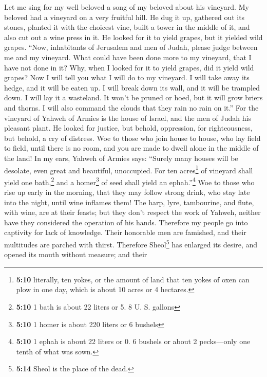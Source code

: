  Let me sing for my well beloved a song of my beloved
about his vineyard. My beloved had a vineyard on a very fruitful hill.
 He dug it up, gathered out its stones, planted it with
the choicest vine, built a tower in the middle of it, and also cut out a
wine press in it. He looked for it to yield grapes, but it yielded wild
grapes.  ``Now, inhabitants of Jerusalem and men of Judah,
please judge between me and my vineyard.  What could have
been done more to my vineyard, that I have not done in it? Why, when I
looked for it to yield grapes, did it yield wild grapes? 
Now I will tell you what I will do to my vineyard. I will take away its
hedge, and it will be eaten up. I will break down its wall, and it will
be trampled down.  I will lay it a wasteland. It won't be
pruned or hoed, but it will grow briers and thorns. I will also command
the clouds that they rain no rain on it.''  For the
vineyard of Yahweh of Armies is the house of Israel, and the men of
Judah his pleasant plant. He looked for justice, but behold, oppression,
for righteousness, but behold, a cry of distress.  Woe to
those who join house to house, who lay field to field, until there is no
room, and you are made to dwell alone in the middle of the land!
 In my ears, Yahweh of Armies says: ``Surely many houses
will be desolate, even great and beautiful, unoccupied. 
For ten acres\footnote{\textbf{5:10} literally, ten yokes, or the amount
  of land that ten yokes of oxen can plow in one day, which is about 10
  acres or 4 hectares.} of vineyard shall yield one bath,\footnote{\textbf{5:10}
  1 bath is about 22 liters or 5. 8 U. S. gallons} and a
homer\footnote{\textbf{5:10} 1 homer is about 220 liters or 6 bushels}
of seed shall yield an ephah.''\footnote{\textbf{5:10} 1 ephah is about
  22 liters or 0. 6 bushels or about 2 pecks---only one tenth of what
  was sown.}  Woe to those who rise up early in the
morning, that they may follow strong drink, who stay late into the
night, until wine inflames them!  The harp, lyre,
tambourine, and flute, with wine, are at their feasts; but they don't
respect the work of Yahweh, neither have they considered the operation
of his hands.  Therefore my people go into captivity for
lack of knowledge. Their honorable men are famished, and their
multitudes are parched with thirst.  Therefore
Sheol\footnote{\textbf{5:14} Sheol is the place of the dead.} has
enlarged its desire, and opened its mouth without measure; and their
